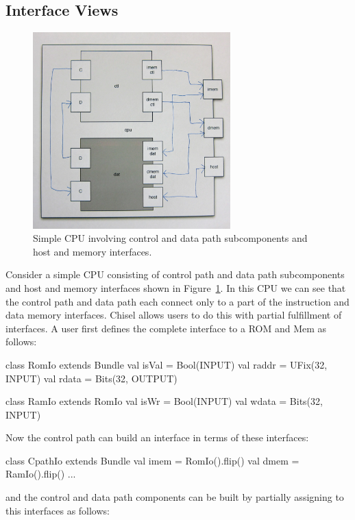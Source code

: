 \documentclass[twocolumn,10pt]{article}
\begin{document}
\subsection{Interface Views}

\begin{figure}
\centerline{\includegraphics[width=3in]{cpu.png}}
\caption{Simple CPU involving control and data path subcomponents and host and memory interfaces.}
\label{fig:cpu}
\end{figure}

Consider a simple CPU consisting of control path and data path subcomponents and host and memory interfaces shown in Figure~\ref{fig:cpu}.
In this CPU we can see that the control path and data path each connect only to a part of the instruction and data memory interfaces. 
Chisel allows users to do this with partial fulfillment of interfaces.
A user first defines the complete interface to a ROM and Mem as follows:

\begin{scala}
class RomIo extends Bundle {
  val isVal = Bool(INPUT)
  val raddr = UFix(32, INPUT)
  val rdata = Bits(32, OUTPUT)
}

class RamIo extends RomIo {
  val isWr  = Bool(INPUT)
  val wdata = Bits(32, INPUT)
}
\end{scala}

\noindent
Now the control path can build an interface in terms of these interfaces:

\begin{scala}
class CpathIo extends Bundle {
  val imem = RomIo().flip()
  val dmem = RamIo().flip()
  ...
}
\end{scala}

\noindent
and the control and data path components can be built by partially assigning to
this interfaces as follows:
\end{document}
